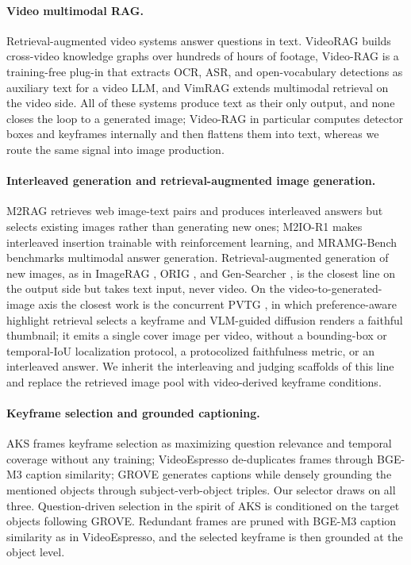 \documentclass[10pt]{article}
\begin{document}
\paragraph{Video multimodal RAG.}
Retrieval-augmented video systems answer questions in text. VideoRAG \citep{videorag2502} builds cross-video knowledge graphs over hundreds of hours of footage, Video-RAG \citep{videorag2411} is a training-free plug-in that extracts OCR, ASR, and open-vocabulary detections as auxiliary text for a video LLM, and VimRAG \citep{vimrag2602} extends multimodal retrieval on the video side. All of these systems produce text as their only output, and none closes the loop to a generated image; Video-RAG in particular computes detector boxes and keyframes internally and then flattens them into text, whereas we route the same signal into image production.

\paragraph{Interleaved generation and retrieval-augmented image generation.}
M2RAG \citep{m2rag2411} retrieves web image-text pairs and produces interleaved answers but selects existing images rather than generating new ones; M2IO-R1 \citep{m2ior12508} makes interleaved insertion trainable with reinforcement learning, and MRAMG-Bench \citep{mramgbench2502} benchmarks multimodal answer generation. Retrieval-augmented generation of new images, as in ImageRAG \citep{imagerag2502}, ORIG \citep{orig2510}, and Gen-Searcher \citep{gensearcher2603}, is the closest line on the output side but takes text input, never video. On the video-to-generated-image axis the closest work is the concurrent PVTG \citep{pvtg2607}, in which preference-aware highlight retrieval selects a keyframe and VLM-guided diffusion renders a faithful thumbnail; it emits a single cover image per video, without a bounding-box or temporal-IoU localization protocol, a protocolized faithfulness metric, or an interleaved answer. We inherit the interleaving and judging scaffolds of this line and replace the retrieved image pool with video-derived keyframe conditions.

\paragraph{Keyframe selection and grounded captioning.}
AKS \citep{aks2502} frames keyframe selection as maximizing question relevance and temporal coverage without any training; VideoEspresso \citep{videoespresso2411} de-duplicates frames through BGE-M3 caption similarity; GROVE \citep{grove2503} generates captions while densely grounding the mentioned objects through subject-verb-object triples. Our selector draws on all three. Question-driven selection in the spirit of AKS is conditioned on the target objects following GROVE. Redundant frames are pruned with BGE-M3 caption similarity as in VideoEspresso, and the selected keyframe is then grounded at the object level.
\end{document}
